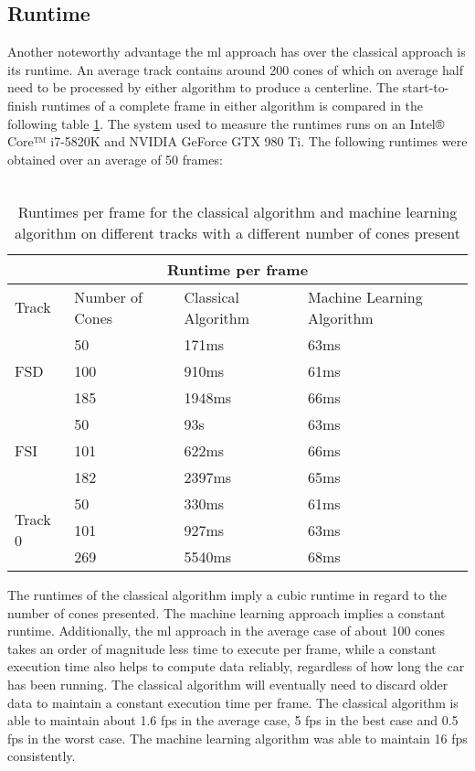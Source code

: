\subsection{Runtime}
Another noteworthy advantage the \ac{ml} approach has over the classical approach is its runtime. An average track contains around 200 cones of which on average half need to be processed by either algorithm to produce a centerline. The start-to-finish runtimes of a complete frame in either algorithm is compared in the following table \ref{table:2}. The system used to measure the runtimes runs on an Intel® Core™ i7-5820K and NVIDIA GeForce GTX 980 Ti. The following runtimes were obtained over an average of 50 frames:\\\\
\begin{table}[h!]
\centering
\begin{tabular}{ |p{1.5cm} p{3cm}||p{4cm}|p{5cm}|  }
    \hline
    \multicolumn{4}{|c|}{Runtime per frame} \\
    \hline
    Track  & Number of Cones  & Classical Algorithm & Machine Learning Algorithm\\
    \hline
    \hline

    \multirow{3}{*}{FSD} & 50  & 171ms & 63ms \\
                         & 100 & 910ms & 61ms\\
                         & 185 & 1948ms & 66ms\\ 
                         \hline
    \multirow{3}{*}{FSI} & 50  & 93s & 63ms\\
                         & 101 & 622ms & 66ms\\
                         & 182 & 2397ms & 65ms\\ 
                         \hline
    \multirow{3}{*}{Track 0} & 50  & 330ms & 61ms\\
                             & 101 & 927ms & 63ms\\
                             & 269 & 5540ms & 68ms\\ 
                             \hline
   \end{tabular}
\caption{Runtimes per frame for the classical algorithm and machine learning algorithm on different tracks with a different number of cones present}
\label{table:2}
\end{table}
$ $\\
The runtimes of the classical algorithm imply a cubic runtime in regard to the number of cones presented. The machine learning approach implies a constant runtime. Additionally, the \ac{ml} approach in the average case of about 100 cones takes an order of magnitude less time to execute per frame, while a constant execution time also helps to compute data reliably, regardless of how long the car has been running. The classical algorithm will eventually need to discard older data to maintain a constant execution time per frame. The classical algorithm is able to maintain about 1.6 \ac{fps} in the average case, 5 \ac{fps} in the best case and 0.5 \ac{fps} in the worst case. The machine learning algorithm was able to maintain 16 \ac{fps} consistently. 